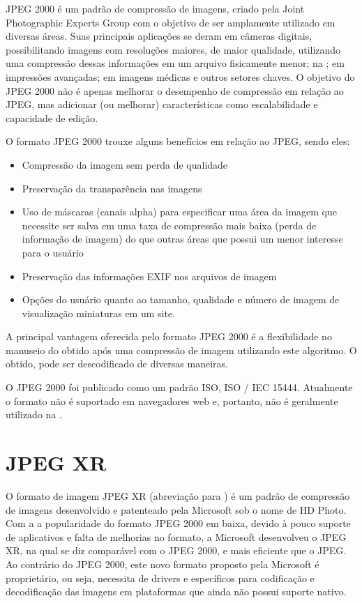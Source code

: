 \documentclass[espaco=simples,appendix=Name]{abnt}
\begin{document}
JPEG 2000 é um padrão de compressão de imagens, criado pela Joint Photographic Experts Group com o objetivo de ser amplamente utilizado em diversas áreas. Suas principais aplicações se deram em câmeras digitais, possibilitando imagens com resoluções maiores, de maior qualidade, utilizando uma compressão dessas informações em um arquivo fisicamente menor; na ; em impressões avançadas; em imagens médicas e outros setores chaves. O objetivo do JPEG 2000 não é apenas melhorar o desempenho de compressão em relação ao JPEG, mas adicionar (ou melhorar) características como escalabilidade e capacidade de edição.

O formato JPEG 2000 trouxe alguns benefícios em relação ao JPEG, sendo eles:
\begin{itemize}
	\item Compressão da imagem sem perda de qualidade
	\item Preservação da transparência nas imagens
	\item Uso de máscaras (canais alpha) para especificar uma área da imagem que necessite ser salva em uma taxa de compressão mais baixa (perda de informação de imagem) do que outras áreas que possui um menor interesse para o usuário
	\item Preservação das informações EXIF nos arquivos de imagem
	\item Opções do usuário quanto ao tamanho, qualidade e número de imagem de visualização miniaturas em um site.
\end{itemize}

A principal vantagem oferecida pelo formato JPEG 2000 é a flexibilidade no manuseio do obtido após uma compressão de imagem utilizando este algoritmo. O  obtido, pode ser descodificado de diversas maneiras.

O JPEG 2000 foi publicado como um padrão ISO, ISO / IEC 15444. Atualmente o formato não é suportado em navegadores web e, portanto, não é geralmente utilizado na .\cite{JPEG}

\section{JPEG XR}

O formato de imagem JPEG XR (abreviação para ) é um padrão de compressão de imagens desenvolvido e patenteado pela Microsoft sob o nome de HD Photo.
Com a a popularidade do formato JPEG 2000 em baixa, devido à pouco suporte de aplicativos e falta de melhorias no formato, a Microsoft desenvolveu o JPEG XR, na qual se diz comparável com o JPEG 2000, e mais eficiente que o JPEG. Ao contrário do JPEG 2000, este novo formato proposto pela Microsoft é proprietário, ou seja, necessita de drivers e  específicos para codificação e decodificação das imagens em plataformas que ainda não possui suporte nativo.
\end{document}
